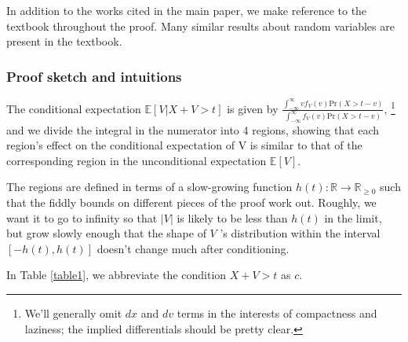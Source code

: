 \documentclass[../neurips_2024.tex]{subfiles}
\begin{document}
In addition to the works cited in the main paper, we make reference to the textbook \citep{foss2013introduction} throughout the proof. Many similar results about random variables are present in the textbook.

\subsubsection{Proof sketch and intuitions}

 The conditional expectation \(\mathbb E[V | X + V > t]\) is given by \(\frac{\int_{-\infty}^\infty vf_V(v)\text{Pr}(X>t-v)} {\int_{-\infty}^\infty f_V(v)\text{Pr}(X>t-v)}\), \footnote{We'll generally omit \(dx\) and \(dv\) terms in the interests of compactness and laziness; the implied differentials should be pretty clear.}
 and we divide the integral in the numerator into 4 regions, showing that each region's effect on the conditional expectation of V is similar to that of the corresponding region in the unconditional expectation \(\mathbb E[V]\).

The regions are defined in terms of a slow-growing function \(h(t):\mathbb R \to \mathbb R_{\ge 0}\) such that the fiddly bounds on different pieces of the proof work out. Roughly, we want it to go to infinity so that \(|V|\) is likely to be less than \(h(t)\) in the limit, but grow slowly enough that the shape of \(V\) 's distribution within the interval \([-h(t),h(t)]\) doesn't change much after conditioning.

In Table \ref{table1}, we abbreviate the condition \(X+V>t\) as \(c\).
\end{document}

